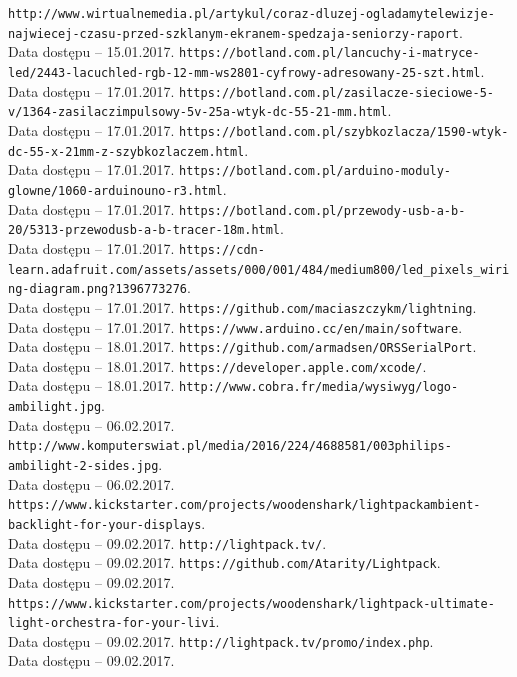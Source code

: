 \documentclass[12pt]{report}
\begin{document}
\begin{thebibliography}{99}
 {\tt http://www.wirtualnemedia.pl/artykul/coraz-dluzej-ogladamy\-telewizje-najwiecej-czasu-przed-szklanym-ekranem-spedzaja\--seniorzy-raport}.\\Data dostępu -- 15.01.2017.
 {\tt https://botland.com.pl/lancuchy-i-matryce-led/2443-lacuch\-led-rgb-12-mm-ws2801-cyfrowy-adresowany-25-szt.html}.\\Data dostępu -- 17.01.2017.
 {\tt https://botland.com.pl/zasilacze-sieciowe-5-v/1364-zasilacz\-impulsowy-5v-25a-wtyk-dc-55-21-mm.html}.\\Data dostępu -- 17.01.2017.
 {\tt https://botland.com.pl/szybkozlacza/1590-wtyk-dc-55-x-21\-mm-z-szybkozlaczem.html}.\\Data dostępu -- 17.01.2017.
 {\tt https://botland.com.pl/arduino-moduly-glowne/1060-arduino\-uno-r3.html}.\\Data dostępu -- 17.01.2017.
 {\tt https://botland.com.pl/przewody-usb-a-b-20/5313-przewod\-usb-a-b-tracer-18m.html}.\\Data dostępu -- 17.01.2017.
 {\tt https://cdn-learn.adafruit.com/assets/assets/000/001/484/\-medium800/led\_pixels\_wiring-diagram.png?1396773276}.\\Data dostępu -- 17.01.2017.
 {\tt https://github.com/maciaszczykm/lightning}.\\Data dostępu -- 17.01.2017.
 {\tt https://www.arduino.cc/en/main/software}.\\Data dostępu -- 18.01.2017.
 {\tt https://github.com/armadsen/ORSSerialPort}.\\Data dostępu -- 18.01.2017.
 {\tt https://developer.apple.com/xcode/}.\\Data dostępu -- 18.01.2017.
 {\tt http://www.cobra.fr/media/wysiwyg/logo-ambilight.jpg}. \\Data dostępu -- 06.02.2017.
 {\tt http://www.komputerswiat.pl/media/2016/224/4688581/003\-philips-ambilight-2-sides.jpg}. \\Data dostępu -- 06.02.2017.
 {\tt https://www.kickstarter.com/projects/woodenshark/lightpack\-ambient-backlight-for-your-displays}. \\Data dostępu -- 09.02.2017.
 {\tt http://lightpack.tv/}. \\Data dostępu -- 09.02.2017.
 {\tt https://github.com/Atarity/Lightpack}. \\Data dostępu -- 09.02.2017.
 {\tt https://www.kickstarter.com/projects/woodenshark/lightpack-ultimate-light-orchestra-for-your-livi}. \\Data dostępu -- 09.02.2017.
 {\tt http://lightpack.tv/promo/index.php}. \\Data dostępu -- 09.02.2017.

\end{thebibliography}

\listoffigures

\listoftables

\lstlistoflistings
\end{document}
